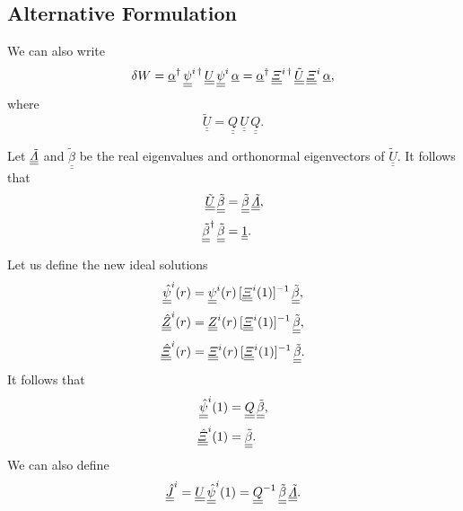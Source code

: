 \documentclass[12pt,prb,aps,notitlepage]{revtex4-1}
\begin{document}
\subsection{Alternative Formulation}
We can also write
\begin{equation}
\delta W =   \underline{\alpha}^\dag\,\underline{\underline{\psi}}^{i\,\dag}\,\underline{\underline{U}}\,\underline{\underline{\psi}}^i\,\underline{\alpha}
  = \underline{\alpha}^\dag\,\underline{\underline{\mit\Xi}}^{i\,\dag}\,\underline{\underline{\tilde{U}}}\,\underline{\underline{\mit\Xi}}^i\,\underline{\alpha},
\end{equation}
where
\begin{equation}
\underline{\underline{\tilde{U}}}= \underline{\underline{Q}}\,\underline{\underline{U}}\,\underline{\underline{Q}}.
\end{equation}

Let 
  $\underline{\underline{\tilde{\mit\Lambda}}}$
  and $\underline{\underline{\tilde{\beta}}}$ be the real eigenvalues and orthonormal eigenvectors of $\underline{\underline{\tilde{U}}}$. 
   It follows that 
 \begin{align}
\underline{\underline{\tilde{U}}}\,\underline{\underline{\tilde{\beta}}}&=\underline{\underline{\tilde{\beta}}}\,\underline{\underline{\tilde{\mit\Lambda}}},\\[0.5ex]
\underline{\underline{\tilde{\beta}}}^\dag\,\underline{\underline{\tilde{\beta}}}&= \underline{\underline{1}}.
\end{align}

Let us define the new ideal solutions
\begin{align}
\underline{\underline{\hat{\psi}}}^i(r)&=\underline{\underline{\psi}}^i(r)\,[\underline{\underline{\mit\Xi}}^i(1)]^{-1}\,\underline{\underline{\tilde{\beta}}},\\[0.5ex]
\underline{\underline{\hat{Z}}}^i(r)   &=\underline{\underline{Z}}^i(r)\,[\underline{\underline{\mit\Xi}}^{i}(1)]^{-1}\,\underline{\underline{\tilde{\beta}}},\\[0.5ex]
\underline{\underline{\hat{\mit\Xi}}}^i(r)   &=\underline{\underline{\mit\Xi}}^i(r)\,[\underline{\underline{\mit\Xi}}^{i}(1)]^{-1}\,\underline{\underline{\tilde{\beta}}}.
\end{align}
It follows that
\begin{align}
\underline{\underline{\hat{\psi}}}^i(1)&=\underline{\underline{Q}}\,\underline{\underline{\tilde{\beta}}},\\[0.5ex]
\underline{\underline{\hat{\mit\Xi}}}^i(1)&=\underline{\underline{\tilde{\beta}}}.
\end{align}
We can also define
\begin{equation}
\underline{\underline{\hat{J}}}^i=\underline{\underline{U}}\,\underline{\underline{\hat{\psi}}}^i(1)= \underline{\underline{Q}}^{-1}\,\underline{\underline{\tilde{\beta}}}\,
\underline{\underline{\tilde{\mit\Lambda}}}.
\end{equation}
\end{document}
